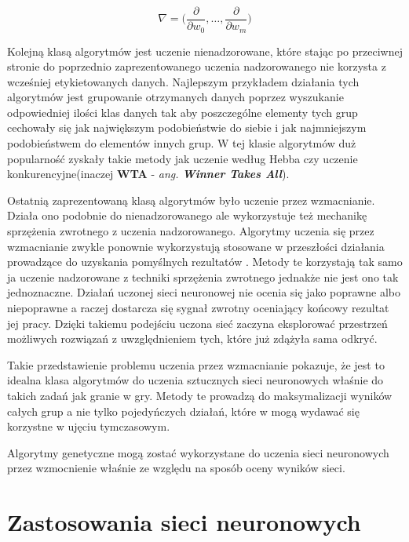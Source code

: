 \documentclass[12pt, oneside, a4paper]{report}
\begin{document}
\begin{equation}\label{eq: 2.gradient-2}
	\nabla = \bigg( \frac{\partial}{\partial w_0}, \dots ,\frac{\partial}{\partial w_m} \bigg)
\end{equation}

Kolejną klasą algorytmów jest uczenie nienadzorowane, które stając po przeciwnej stronie do poprzednio zaprezentowanego uczenia nadzorowanego nie korzysta z wcześniej etykietowanych danych. Najlepszym przykładem działania tych algorytmów jest grupowanie otrzymanych danych poprzez wyszukanie odpowiedniej ilości klas danych tak aby poszczególne elementy tych grup cechowały się jak największym podobieństwie do siebie i jak najmniejszym podobieństwem do elementów innych grup. W tej klasie algorytmów duż popularność zyskały takie metody jak uczenie według Hebba czy uczenie konkurencyjne(inaczej \textbf{WTA} - \textit{ang. \textbf{Winner Takes All}}).

Ostatnią zaprezentowaną klasą algorytmów było uczenie przez wzmacnianie. Działa ono podobnie do nienadzorowanego ale wykorzystuje też mechanikę sprzężenia zwrotnego z uczenia nadzorowanego. Algorytmy uczenia się przez wzmacnianie zwykle ponownie wykorzystują stosowane w przeszłości działania prowadzące do uzyskania pomyślnych rezultatów \citep{roelants2017deeplearning}. Metody te korzystają tak samo ja uczenie nadzorowane z techniki sprzężenia zwrotnego jednakże nie jest ono tak jednoznaczne. Działań uczonej sieci neuronowej nie ocenia się jako poprawne albo niepoprawne a raczej dostarcza się sygnał zwrotny oceniający końcowy rezultat jej pracy. Dzięki takiemu podejściu uczona sieć zaczyna eksplorować przestrzeń możliwych rozwiązań z uwzględnieniem tych, które już zdążyła sama odkryć. 

Takie przedstawienie problemu uczenia przez wzmacnianie pokazuje, że jest to idealna klasa algorytmów do uczenia sztucznych sieci neuronowych właśnie do takich zadań jak granie w gry. Metody te prowadzą do maksymalizacji wyników całych grup a nie tylko pojedyńczych działań, które w mogą wydawać się korzystne w ujęciu tymczasowym.

Algorytmy genetyczne mogą zostać wykorzystane do uczenia sieci neuronowych przez wzmocnienie właśnie ze względu na sposób oceny wyników sieci.

\section{Zastosowania sieci neuronowych}
\end{document}
